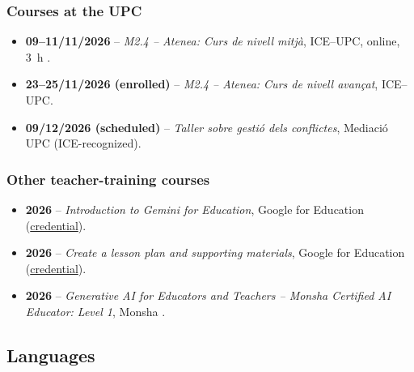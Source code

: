 \documentclass[11pt]{article}
\newcommand{\NEW}[1]{\iffinal #1\else{\color{red}#1}\fi} %
\begin{document}
\subsubsection*{\NEW{Courses at the UPC}}
\begin{itemize}[itemsep=1pt]
  \item \textbf{09--11/11/2026} -- \emph{M2.4 -- Atenea: Curs de nivell mitj\`a}, ICE--UPC, online, 3~h .
  \item \textbf{23--25/11/2026 (enrolled)} -- \emph{M2.4 -- Atenea: Curs de nivell \NEW{avan\c{c}at}}, ICE--UPC.
  \item \textbf{09/12/2026 (scheduled)} -- \emph{Taller sobre gesti\'o dels conflictes}, Mediaci\'o UPC (ICE-recognized).
\end{itemize}

\subsubsection*{Other teacher-training courses}
\begin{itemize}[itemsep=1pt]
  \item \textbf{2026} -- \emph{Introduction to Gemini for Education}, Google for Education
  (\href{https://edu.google.accredible.com/9e5d562b-d731-4909-a64e-02fec77496c1}{credential}).
  \item \textbf{2026} -- \emph{Create a lesson plan and supporting materials}, Google for Education
  (\href{https://edu.google.accredible.com/40c5d590-11e2-4418-a7be-5a64a7268e6c}{credential}).
  \item \textbf{2026} -- \emph{Generative AI for Educators and Teachers -- Monsha Certified AI
  Educator: Level 1}, Monsha .
\end{itemize}

\subsection{Languages}\label{sec:languages}
\begin{entries}
\end{entries}
\end{document}
